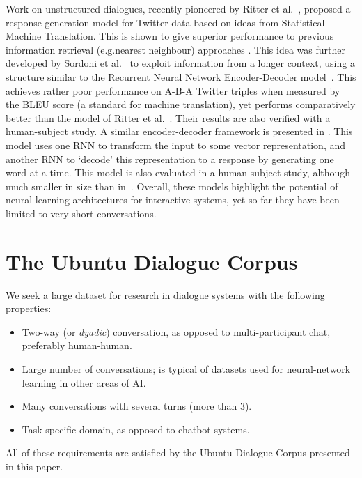 \documentclass[11pt,a4paper]{article}
\begin{document}
Work on unstructured dialogues, recently pioneered by Ritter et al.~\cite{ritter2011data}, proposed a response generation model for Twitter data based on ideas from Statistical Machine Translation. This is shown to give superior performance to previous information retrieval (e.g.\@ nearest neighbour) approaches \cite{jafarpour2010filter}. This idea was further developed by Sordoni et al.~\cite{sordoni2015} to exploit information from a longer context, using a structure similar to the Recurrent Neural Network Encoder-Decoder model~\cite{cho2014learning}. This achieves rather poor performance on A-B-A Twitter triples when measured by the BLEU score (a standard for machine translation), yet performs comparatively better than the model of Ritter et al.~\cite{ritter2011data}. Their results are also verified with a human-subject study. A similar encoder-decoder framework is presented in \cite{shang2015neural}. This model uses one RNN to transform the input to some vector representation, and another RNN to `decode' this representation to a response by generating one word at a time. This model is  also evaluated in a human-subject study, although much smaller in size than in~\cite{sordoni2015}. Overall, these models highlight the potential of neural learning architectures for interactive systems, yet so far they have been limited to very short conversations.




\section{The Ubuntu Dialogue Corpus}

We seek a large dataset for research in dialogue systems with the following properties:

\begin{itemize}[noitemsep,nolistsep]
\item Two-way (or \textit{dyadic}) conversation, as opposed to multi-participant chat, preferably human-human.
\item Large number of conversations;  is typical of datasets used for neural-network learning in other areas of AI.
\item Many conversations with several turns (more than 3).
\item Task-specific domain, as opposed to chatbot systems.
\end{itemize}
All of these requirements are satisfied by the Ubuntu Dialogue Corpus presented in this paper.
\end{document}

